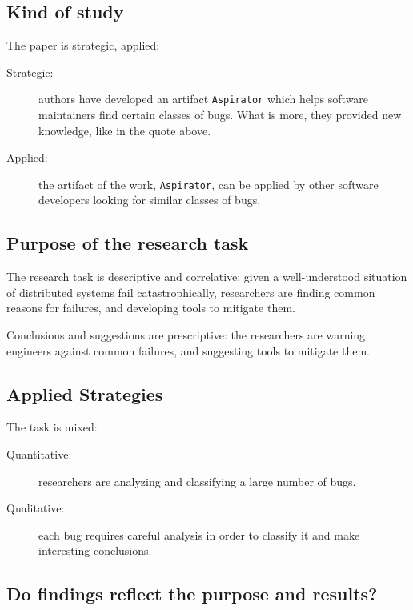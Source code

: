\documentclass{article}
\begin{document}
\subsection{Kind of study}
The paper is strategic, applied:

\begin{description}

    \item[Strategic:] authors have developed an artifact \texttt{Aspirator}
        which helps software maintainers find certain classes of bugs. What is
        more, they provided new knowledge, like in the quote above.

    \item[Applied:] the artifact of the work, \texttt{Aspirator}, can be
        applied by other software developers looking for similar classes of
        bugs.

\end{description}

\subsection{Purpose of the research task}

The research task is descriptive and correlative: given a well-understood
situation of distributed systems fail catastrophically, researchers are finding
common reasons for failures, and developing tools to mitigate them.

Conclusions and suggestions are prescriptive: the researchers are warning
engineers against common failures, and suggesting tools to mitigate them.

\subsection{Applied Strategies}

The task is mixed:
\begin{description}
    \item[Quantitative:] researchers are analyzing and classifying a large
        number of bugs.
    \item[Qualitative:] each bug requires careful analysis in order to classify
        it and make interesting conclusions.
\end{description}

\subsection{Do findings reflect the purpose and results?}
\label{sec:findings-purpose-result}
\end{document}
